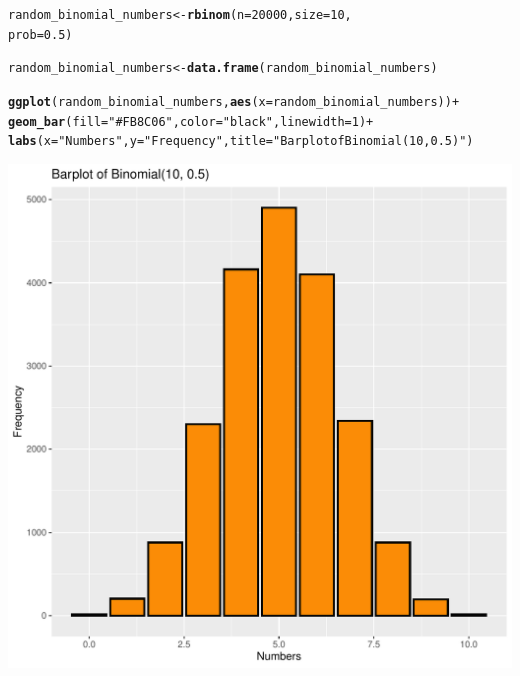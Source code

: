 \documentclass[11pt, a4paper]{article}\usepackage[]{graphicx}\usepackage[]{xcolor}
\makeatletter
\def\maxwidth{ %
  \ifdim\Gin@nat@width>\linewidth
    \linewidth
  \else
    \Gin@nat@width
  \fi
}
\newcommand{\hlnum}[1]{\textcolor[rgb]{0.686,0.059,0.569}{#1}}%
\newcommand{\hlstr}[1]{\textcolor[rgb]{0.192,0.494,0.8}{#1}}%
\newcommand{\hlopt}[1]{\textcolor[rgb]{0,0,0}{#1}}%
\newcommand{\hlstd}[1]{\textcolor[rgb]{0.345,0.345,0.345}{#1}}%
\newcommand{\hlkwb}[1]{\textcolor[rgb]{0.69,0.353,0.396}{#1}}%
\newcommand{\hlkwc}[1]{\textcolor[rgb]{0.333,0.667,0.333}{#1}}%
\newcommand{\hlkwd}[1]{\textcolor[rgb]{0.737,0.353,0.396}{\textbf{#1}}}%
\newenvironment{kframe}{%
 \def\at@end@of@kframe{}%
 \ifinner\ifhmode%
  \def\at@end@of@kframe{\end{minipage}}%
  \begin{minipage}{\columnwidth}%
 \fi\fi%
 \def\FrameCommand##1{\hskip\@totalleftmargin \hskip-\fboxsep
 \colorbox{shadecolor}{##1}\hskip-\fboxsep
     \hskip-\linewidth \hskip-\@totalleftmargin \hskip\columnwidth}%
 \MakeFramed {\advance\hsize-\width
   \@totalleftmargin\z@ \linewidth\hsize
   \@setminipage}}%
 {\par\unskip\endMakeFramed%
 \at@end@of@kframe}
\newenvironment{knitrout}{}{} %
\makeatother
\begin{document}
\begin{knitrout}
\color{fgcolor}\begin{kframe}
\begin{alltt}
\hlstd{random_binomial_numbers} \hlkwb{<-} \hlkwd{rbinom}\hlstd{(}\hlkwc{n} \hlstd{=} \hlnum{20000}\hlstd{,} \hlkwc{size} \hlstd{=} \hlnum{10}\hlstd{,}
    \hlkwc{prob} \hlstd{=} \hlnum{0.5}\hlstd{)}

\hlstd{random_binomial_numbers} \hlkwb{<-} \hlkwd{data.frame}\hlstd{(random_binomial_numbers)}

\hlkwd{ggplot}\hlstd{(random_binomial_numbers,} \hlkwd{aes}\hlstd{(}\hlkwc{x} \hlstd{= random_binomial_numbers))} \hlopt{+}
    \hlkwd{geom_bar}\hlstd{(}\hlkwc{fill} \hlstd{=} \hlstr{"#FB8C06"}\hlstd{,} \hlkwc{color} \hlstd{=} \hlstr{"black"}\hlstd{,} \hlkwc{linewidth} \hlstd{=} \hlnum{1}\hlstd{)} \hlopt{+}
    \hlkwd{labs}\hlstd{(}\hlkwc{x} \hlstd{=} \hlstr{"Numbers"}\hlstd{,} \hlkwc{y} \hlstd{=} \hlstr{"Frequency"}\hlstd{,} \hlkwc{title} \hlstd{=} \hlstr{"Barplot of Binomial(10, 0.5)"}\hlstd{)}
\end{alltt}
\end{kframe}
\includegraphics[width=\maxwidth]{figure/unnamed-chunk-19-1} 
\end{knitrout}

\newpage
\end{document}
